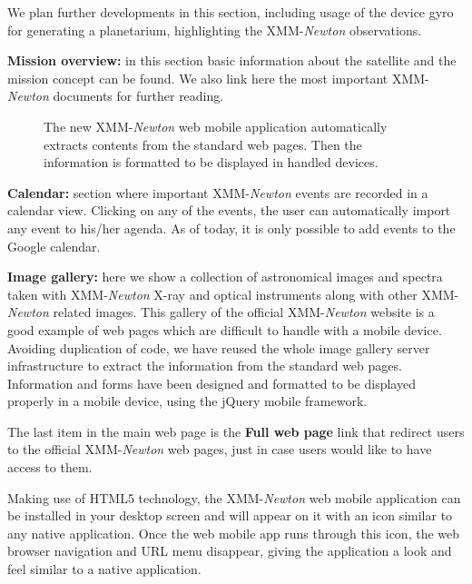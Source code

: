 We plan further developments in this section, including usage of the device gyro for generating a planetarium, highlighting the XMM-{\em Newton} observations.

{\bf Mission overview:} in this section basic information about the satellite and the mission concept can be found. We also link here the most important XMM-{\em Newton} documents for further reading. 

\begin{figure}[h]
\caption{ The new XMM-{\em Newton} web mobile application automatically extracts contents from the standard web pages. Then the information is formatted to be displayed in handled devices.} \label{P061-fig-1}
\end{figure}


{\bf Calendar:} section where important XMM-{\em Newton} events are recorded in a calendar view. Clicking on any of the events, the user can automatically import any event to his/her agenda. As of today, it is only possible to add events to the Google calendar.

{\bf Image gallery:} here we show a collection of astronomical images and spectra taken with XMM-{\em Newton} X-ray and optical instruments along with other XMM-{\em Newton} related images. This gallery of the official XMM-{\em Newton} website is a good example of web pages which are difficult to handle with a mobile device. Avoiding duplication of code, we have reused the whole image gallery server infrastructure to extract the information from the standard web pages.  Information and forms have been designed and formatted to be displayed properly in a mobile device, using the jQuery mobile framework.

The last item in the main web page is the {\bf Full web page} link that redirect users to the official XMM-{\em Newton} web pages, just in case users would like to have access to them.

Making use of HTML5 technology, the XMM-{\em Newton} web mobile application can be installed in your desktop screen and will appear on it with an icon similar to any native application. Once the web mobile app runs through this icon, the web browser navigation and URL menu disappear, giving the application a look and feel similar to a native application.

